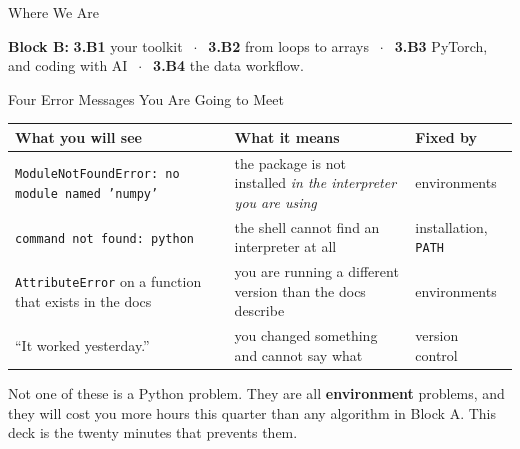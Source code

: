 

\graphicspath{{./figures/}}





\makedecktitle

\begin{frame}{Where We Are}
\vspace{-1mm}
\begin{center}
\small \textbf{Block B:} \textbf{3.B1} your toolkit $\;\cdot\;$ \textbf{3.B2} from loops to arrays $\;\cdot\;$ \textbf{3.B3} PyTorch, and coding with AI $\;\cdot\;$ \textbf{3.B4} the data workflow.
\end{center}
\end{frame}

\begin{frame}{Four Error Messages You Are Going to Meet}
\renewcommand{\arraystretch}{1.25}
\begin{center}\footnotesize
\begin{tabularx}{\linewidth}{@{}>{\raggedright\arraybackslash}p{5.0cm} >{\raggedright\arraybackslash}X >{\raggedright\arraybackslash}p{2.6cm}@{}}
\toprule
\textbf{What you will see} & \textbf{What it means} & \textbf{Fixed by} \\
\midrule
\texttt{ModuleNotFoundError: no module named 'numpy'} & the package is not installed \emph{in the interpreter you are using} & environments \\
\texttt{command not found: python} & the shell cannot find an interpreter at all & installation, \texttt{PATH} \\
\texttt{AttributeError} on a function that exists in the docs & you are running a different version than the docs describe & environments \\
``It worked yesterday.'' & you changed something and cannot say what & version control \\
\bottomrule
\end{tabularx}
\end{center}
\vspace{1mm}
\begin{conceptbox}\small
Not one of these is a Python problem. They are all \textbf{environment} problems, and they will cost you more hours this quarter than any algorithm in Block A. This deck is the twenty minutes that prevents them.
\end{conceptbox}
\end{frame}

